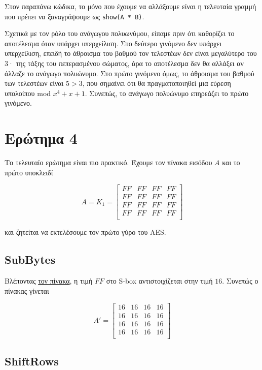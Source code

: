 \documentclass{article}
\begin{document}
Στον παραπάνω κώδικα, το μόνο που έχουμε να αλλάξουμε είναι η τελευταία γραμμή που πρέπει να ξαναγράψουμε ως \lstinline|show(A * B)|.

Σχετικά με τον ρόλο του ανάγωγου πολυωνύμου, είπαμε πριν ότι καθορίζει το αποτέλεσμα όταν υπάρχει υπερχείλιση. Στο δεύτερο γινόμενο δεν υπάρχει υπερχείλιση, επειδή το άθροισμα του βαθμού τον τελεστέων δεν είναι μεγαλύτερο του $3$· της τάξης του πεπερασμένου σώματος, άρα το αποτέλεσμα δεν θα αλλάξει αν άλλαζε το ανάγωγο πολυώνυμο. Στο πρώτο γινόμενο όμως, το άθροισμα του βαθμού των τελεστέων είναι $5 > 3$, που σημαίνει ότι θα πραγματοποιηθεί μια εύρεση υπολοίπου mod $x^4 + x + 1$. Συνεπώς, το ανάγωγο πολυώνυμο επηρεάζει το πρώτο γινόμενο.

\section*{Ερώτημα 4}

Το τελευταίο ερώτημα είναι πιο πρακτικό. Έχουμε τον πίνακα εισόδου $A$ και το πρώτο υποκλειδί

$$
A = K_1 =
\begin{bmatrix}
FF & FF & FF & FF \\
FF & FF & FF & FF \\
FF & FF & FF & FF \\
FF & FF & FF & FF \\
\end{bmatrix}
$$

και ζητείται να εκτελέσουμε τον πρώτο γύρο του AES.

\subsection*{SubBytes}

Βλέποντας \href{https://en.wikipedia.org/wiki/Rijndael_S-box}{τον πίνακα}, η τιμή $FF$ στο S-box αντιστοιχίζεται στην τιμή $16$. Συνεπώς ο πίνακας γίνεται

$$
A' =
\begin{bmatrix}
16 & 16 & 16 & 16 \\
16 & 16 & 16 & 16 \\
16 & 16 & 16 & 16 \\
16 & 16 & 16 & 16 \\
\end{bmatrix}
$$

\subsection*{ShiftRows}
\end{document}
